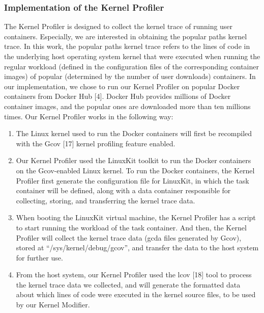 \subsubsection{Implementation of the Kernel Profiler}
\label{sec.design.implementation.kernel_profiler}
The Kernel Profiler is designed to collect the kernel trace of running user containers. 
Especially, we are interested in obtaining the popular paths kernel trace. 
In this work, the popular paths kernel trace refers to the lines of code in the underlying host operating system kernel that were executed when running the regular workload 
(defined in the configuration files of the corresponding container images) of popular (determined by the number of user downloads) containers. 
In our implementation, we chose to run our Kernel Profiler on popular Docker containers from Docker Hub [4]. 
Docker Hub provides millions of Docker container images, and the popular ones are downloaded more than ten millions times. 
Our Kernel Profiler works in the following way: 
\begin{enumerate}
	\item The Linux kernel used to run the Docker containers will first be recompiled with the Gcov [17] kernel profiling feature enabled. 
	\item Our Kernel Profiler used the LinuxKit toolkit to run the Docker containers on the Gcov-enabled Linux kernel. 
	To run the Docker containers, the Kernel Profiler first generate the configuration file for LinuxKit, in which the task container will be defined, 
	along with a data container responsible for collecting, storing, and transferring the kernel trace data. 
	\item When booting the LinuxKit virtual machine, the Kernel Profiler has a script to start running the workload of the task container. 
	And then, the Kernel Profiler will collect the kernel trace data (gcda files generated by Gcov), stored at ``/sys/kernel/debug/gcov'', 
	and transfer the data to the host system for further use. 
	\item From the host system, our Kernel Profiler used the lcov [18] tool to process the kernel trace data we collected, 
	and will generate the formatted data about which lines of code were executed in the kernel source files, to be used by our Kernel Modifier. 
\end{enumerate}

